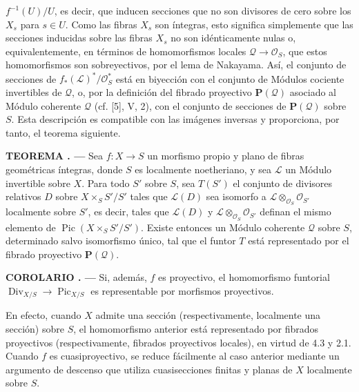 \documentclass[11pt,twoside,openany]{book}
\numberwithin{equation}{section}
\newcommand{\src}[1]{%
  \phantomsection\hypertarget{src:#1}{}%
  \marginpar{\raggedleft\footnotesize\sffamily #1}%
}
\theoremstyle{plain}
\theoremstyle{definition}
\theoremstyle{remark}
\newcommand{\result}[2]{%
  \par\medskip\noindent\textbf{#1%
  \if\relax\detokenize{#2}\relax\else\space#2\fi. ---}\enspace
}
\newcommand{\FgaUnitKey}{frontmatter}
\renewcommand{\src}[1]{%
  \phantomsection\hypertarget{src:\FgaUnitKey:#1}{}%
  \marginpar{\raggedleft\footnotesize\sffamily #1}%
}
\theoremstyle{plain}
\theoremstyle{definition}
\theoremstyle{remark}
\begin{document}
\src{153}
$f^{-1}(U)/U$, es decir, que inducen secciones que no son divisores de cero
sobre los $X_s$ para $s\in U$. Como las fibras $X_s$ son íntegras, esto
significa simplemente que las secciones inducidas sobre las fibras $X_s$ no
son idénticamente nulas o, equivalentemente, en términos de homomorfismos
locales $\mathcal Q\longrightarrow\mathcal O_S$, que estos homomorfismos son
sobreyectivos, por el lema de Nakayama. Así, el conjunto de secciones de
$f_*(\mathcal L)^*/\mathcal O_S^*$ está en biyección con el conjunto de
Módulos cociente invertibles de $\mathcal Q$, o, por la definición del fibrado
proyectivo $\mathbf P(\mathcal Q)$ asociado al Módulo coherente $\mathcal Q$
(cf. [5], V, 2), con el conjunto de secciones de $\mathbf P(\mathcal Q)$ sobre
$S$. Esta descripción es compatible con las imágenes inversas y proporciona,
por tanto, el teorema siguiente.

\result{TEOREMA}{4.3} Sea $f:X\longrightarrow S$ un morfismo propio y plano de
fibras geométricas íntegras, donde $S$ es localmente noetheriano, y sea
$\mathcal L$ un Módulo invertible sobre $X$. Para todo $S'$ sobre $S$, sea
$T(S')$ el conjunto de divisores relativos $D$ sobre $X\times_SS'/S'$ tales
que $\mathcal L(D)$ sea isomorfo a
$\mathcal L\otimes_{\mathcal O_S}\mathcal O_{S'}$ localmente sobre $S'$, es decir, tales que
$\mathcal L(D)$ y $\mathcal L\otimes_{\mathcal O_S}\mathcal O_{S'}$ definan
el mismo elemento de $\operatorname{Pic}(X\times_SS'/S')$. Existe entonces un
Módulo coherente $\mathcal Q$ sobre $S$, determinado salvo isomorfismo único,
tal que el funtor $T$ está representado por el fibrado proyectivo
$\mathbf P(\mathcal Q)$.

\result{COROLARIO}{4.4} Si, además, $f$ es proyectivo, el homomorfismo funtorial
$\operatorname{Div}_{X/S}\longrightarrow\operatorname{Pic}_{X/S}$ es
representable por morfismos proyectivos.

En efecto, cuando $X$ admite una sección (respectivamente, localmente una
sección) sobre $S$, el homomorfismo anterior está representado por fibrados
proyectivos (respectivamente, fibrados proyectivos locales), en virtud de 4.3 y
2.1. Cuando $f$ es cuasiproyectivo, se reduce fácilmente al caso anterior
mediante un argumento de descenso que utiliza cuasisecciones finitas y planas
de $X$ localmente sobre $S$.
\end{document}
